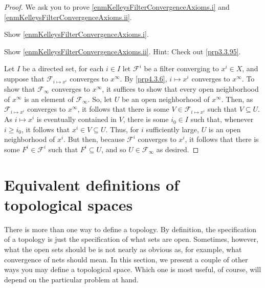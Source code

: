 \begin{prp}
\begin{savenotes}
\begin{rmk}
\end{rmk}
\begin{proof}
We ask you to prove \ref{enmKelleysFilterConvergenceAxioms.i} and \ref{enmKelleysFilterConvergenceAxioms.ii}.
\begin{exr}
Show \ref{enmKelleysFilterConvergenceAxioms.i}.
\end{exr}
\begin{exr}
Show \ref{enmKelleysFilterConvergenceAxioms.ii}.  Hint:  Check out \cref{prp3.3.95}.
\end{exr}
Let $I$ be a directed set, for each $i\in I$ let $\mathcal{F}^i$ be a filter converging to $x^i\in X$, and suppose that $\mathcal{F}_{i\mapsto x^i}$ converges to $x^\infty$.  By \cref{prp4.3.6}, $i\mapsto x^i$ converges to $x^\infty$.  To show that $\mathcal{F}_\infty$ converges to $x^\infty$, it suffices to show that every open neighborhood of $x^\infty$ is an element of $\mathcal{F}_\infty$.  So, let $U$ be an open neighborhood of $x^\infty$.  Then, as $\mathcal{F}_{i\mapsto x^i}$ converges to $x^\infty$, it follows that there is some $V\in \mathcal{F}_{i\mapsto x^i}$ such that $V\subseteq U$.  As $i\mapsto x^i$ is eventually contained in $V$, there is some $i_0\in I$ such that, whenever $i\geq i_0$, it follows that $x^i\in V\subseteq U$.  Thus, for $i$ sufficiently large, $U$ is an open neighborhood of $x^i$.  But then, because $\mathcal{F}^i$ converges to $x^i$, it follows that there is some $F^i\in \mathcal{F}^i$ such that $F^i\subseteq U$, and so $U\in \mathcal{F}_{\infty}$ as desired.
\end{proof}
\end{savenotes}
\end{prp}

\section{Equivalent definitions of topological spaces}

There is more than one way to define a topology.  By definition, the specification of a topology is just the specification of what sets are open.  Sometimes, however, what the open sets should be is not nearly as obvious as, for example, what convergence of nets should mean.  In this section, we present a couple of other ways you may define a topological space.  Which one is most useful, of course, will depend on the particular problem at hand.

